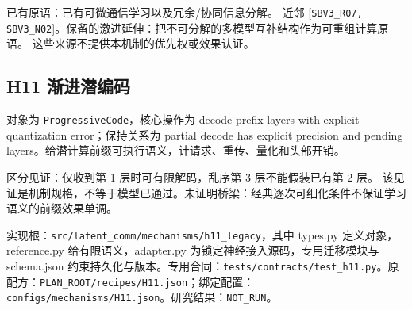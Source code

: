 \documentclass[
  10pt,
]{article}
\begin{document}
已有原语：已有可微通信学习以及冗余/协同信息分解。 近邻
{[}\nolinkurl{SBV3_R07,}
\nolinkurl{SBV3_N02}{]}。保留的激进延伸：把不可分解的多模型互补结构作为可重组计算原语。
这些来源不提供本机制的优先权或效果认证。

\subsection{H11 渐进潜编码}\label{h11-ux6e10ux8fdbux6f5cux7f16ux7801}

对象为 \nolinkurl{ProgressiveCode}，核心操作为 decode prefix layers with
explicit quantization error；保持关系为 partial decode has explicit
precision and pending
layers。给潜计算前缀可执行语义，计请求、重传、量化和头部开销。

区分见证：仅收到第 1 层时可有限解码，乱序第 3 层不能假装已有第 2 层。
该见证是机制规格，不等于模型已通过。未证明桥梁：经典逐次可细化条件不保证学习语义的前缀效果单调。

实现根：{\small\nolinkurl{src/latent_comm/mechanisms/h11_legacy}}，其中
types.py 定义对象，reference.py 给有限语义，adapter.py
为锁定神经接入源码，专用迁移模块与 schema.json
约束持久化与版本。专用合同：{\small\nolinkurl{tests/contracts/test_h11.py}}。原配方：{\small\nolinkurl{PLAN_ROOT/recipes/H11.json}}；绑定配置：{\small\nolinkurl{configs/mechanisms/H11.json}}。研究结果：\nolinkurl{NOT_RUN}。
\end{document}
